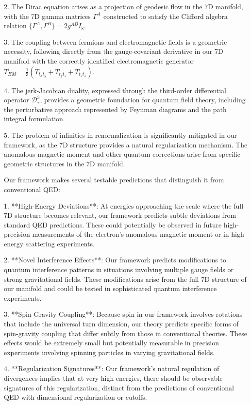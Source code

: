 \documentclass{article}
\begin{document}
2. The Dirac equation arises as a projection of geodesic flow in the 7D manifold, with the 7D gamma matrices $\Gamma^A$ constructed to satisfy the Clifford algebra relation $\{\Gamma^A, \Gamma^B\} = 2g^{AB}I_8$.

3. The coupling between fermions and electromagnetic fields is a geometric necessity, following directly from the gauge-covariant derivative in our 7D manifold with the correctly identified electromagnetic generator $T_{EM} = \frac{1}{3}(T_{t_x t_y} + T_{t_y t_z} + T_{t_z t_x})$.

4. The jerk-Jacobian duality, expressed through the third-order differential operator $\mathcal{D}_\tau^3$, provides a geometric foundation for quantum field theory, including the perturbative approach represented by Feynman diagrams and the path integral formulation.

5. The problem of infinities in renormalization is significantly mitigated in our framework, as the 7D structure provides a natural regularization mechanism. The anomalous magnetic moment and other quantum corrections arise from specific geometric structures in the 7D manifold.

Our framework makes several testable predictions that distinguish it from conventional QED:

1. **High-Energy Deviations**: At energies approaching the scale where the full 7D structure becomes relevant, our framework predicts subtle deviations from standard QED predictions. These could potentially be observed in future high-precision measurements of the electron's anomalous magnetic moment or in high-energy scattering experiments.

2. **Novel Interference Effects**: Our framework predicts modifications to quantum interference patterns in situations involving multiple gauge fields or strong gravitational fields. These modifications arise from the full 7D structure of our manifold and could be tested in sophisticated quantum interference experiments.

3. **Spin-Gravity Coupling**: Because spin in our framework involves rotations that include the universal turn dimension, our theory predicts specific forms of spin-gravity coupling that differ subtly from those in conventional theories. These effects would be extremely small but potentially measurable in precision experiments involving spinning particles in varying gravitational fields.

4. **Regularization Signatures**: Our framework's natural regulation of divergences implies that at very high energies, there should be observable signatures of this regularization, distinct from the predictions of conventional QED with dimensional regularization or cutoffs.
\end{document}
